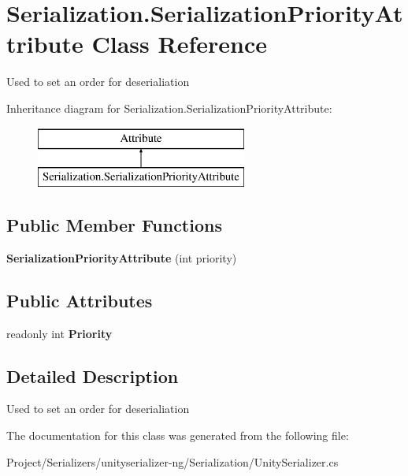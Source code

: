 \hypertarget{class_serialization_1_1_serialization_priority_attribute}{}\section{Serialization.\+Serialization\+Priority\+Attribute Class Reference}
\label{class_serialization_1_1_serialization_priority_attribute}


Used to set an order for deserialiation  


Inheritance diagram for Serialization.\+Serialization\+Priority\+Attribute\+:\begin{figure}[H]
\begin{center}
\leavevmode
\includegraphics[height=2.000000cm]{class_serialization_1_1_serialization_priority_attribute}
\end{center}
\end{figure}
\subsection*{Public Member Functions}
\begin{DoxyCompactItemize}
\item 
\mbox{\label{class_serialization_1_1_serialization_priority_attribute_a0c3f47a8c3fe6ec68a4e9804eef75f61}} 
{\bfseries Serialization\+Priority\+Attribute} (int priority)
\end{DoxyCompactItemize}
\subsection*{Public Attributes}
\begin{DoxyCompactItemize}
\item 
\mbox{\label{class_serialization_1_1_serialization_priority_attribute_ac1837f6eb321efa34ffed0a92f3fc89e}} 
readonly int {\bfseries Priority}
\end{DoxyCompactItemize}


\subsection{Detailed Description}
Used to set an order for deserialiation 



The documentation for this class was generated from the following file\+:\begin{DoxyCompactItemize}
\item 
Project/\+Serializers/unityserializer-\/ng/\+Serialization/Unity\+Serializer.\+cs\end{DoxyCompactItemize}
